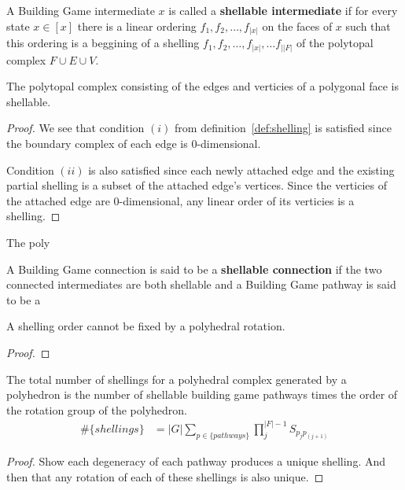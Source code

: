 \begin{mydef}
A Building Game intermediate $x$ is called a \textbf{shellable intermediate} if for every state $x \in [x]$ there is a linear ordering $f_1, f_2, \dots, f_{|x|}$ on the faces of $x$ such that this ordering is a beggining of a shelling $f_1, f_2, \dots, f_{|x|}, \dots f_{||F|}$ of the polytopal complex $F\cup E\cup V$.
\end{mydef}

\begin{mylem}
The polytopal complex consisting of the edges and verticies of a polygonal face is shellable.
\end{mylem}
\begin{proof}
We see that condition $(i)$ from definition~\ref{def:shelling} is satisfied since the boundary complex of each edge is $0$-dimensional.

Condition $(ii)$ is also satisfied since each newly attached edge and the existing partial shelling is a subset of the attached edge's vertices. Since the verticies of the attached edge are $0$-dimensional, any linear order of its verticies is a shelling.
\end{proof}


\begin{mythm}
The poly  
\end{mythm}

\begin{mydef}
A Building Game connection is said to be a \textbf{shellable connection} if the two connected intermediates are both shellable and a Building Game pathway is said to be a 
\end{mydef}



\begin{mylem}
A shelling order cannot be fixed by a polyhedral rotation. 
\end{mylem}
\begin{proof}
\end{proof}

\begin{mythm}
The total number of shellings for a polyhedral complex generated by a polyhedron is the number of shellable building game pathways times the order of the rotation group of the polyhedron.
\begin{align}
\#\{shellings\} &= |G|\sum_{p \in \{pathways\}}\prod_j^{|F|-1}S_{p_jp_{(j+1)}}
\end{align}
\end{mythm}
\begin{proof}
Show each degeneracy of each pathway produces a unique shelling. And then that any rotation of each of these shellings is also unique.
\end{proof}

